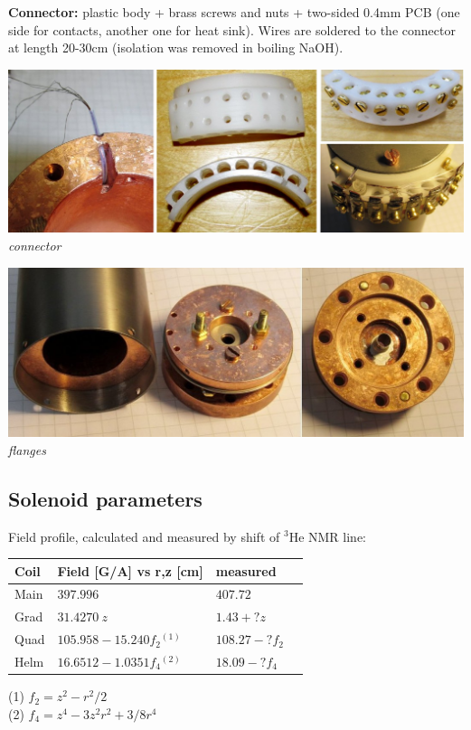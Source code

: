 \documentclass[a4paper]{article}
\begin{document}
{\bf Connector:} plastic body + brass screws and nuts +
two-sided 0.4mm PCB (one side for contacts, another one for heat sink).
Wires are soldered to the connector at length 20-30cm (isolation was
removed in boiling NaOH).

\vbox{\noindent
\includegraphics[width=\linewidth]{img/conn.jpg}\\
{\it connector}}
\medskip

\vbox{\noindent
\includegraphics[width=\linewidth]{img/final.jpg}\\
{\it flanges}}

\subsection*{Solenoid parameters}

Field profile, calculated and measured by shift of $^3$He NMR line:

\medskip
\begin{tabular}{llll}
Coil  &  Field [G/A] vs r,z [cm] & measured\\\hline
Main   &  $397.996$                       & $407.72$\\
Grad   &  $31.4270\ z$                    & $1.43 + ? z$\\
Quad   &  $105.958 - 15.240 f_2$$^{(1)}$  & $108.27 - ? f_2$\\
Helm   &  $16.6512 - 1.0351 f_4$$^{(2)}$  & $18.09 - ? f_4$\\
\end{tabular}

\noindent
(1) $f_2 = z^2-r^2/2$\\
(2) $f_4 = z^4 - 3 z^2 r^2 + 3/8 r^4$
\medskip
\end{document}
